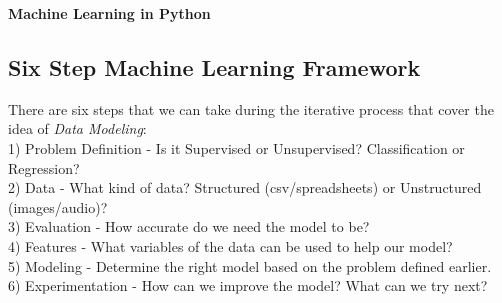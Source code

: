 \documentclass[11pt, a4paper]{article}
\begin{document}
	\begin{titlepage}
		\begin{center} \Huge \textbf{Machine Learning in Python} \end{center}
		\tableofcontents
		\newpage
	\end{titlepage}

	\begin{spacing}{1.1}
	\section{Six Step Machine Learning Framework}
	There are six steps that we can take during the iterative process that cover the idea of \textit{Data Modeling}: \vspace*{1mm}\\
	\hspace*{2mm} 1) Problem Definition - Is it Supervised or Unsupervised? Classification or Regression? \\
	\hspace*{2mm} 2) Data - What kind of data? Structured (csv/spreadsheets) or Unstructured (images/audio)?\\
	\hspace*{2mm} 3) Evaluation - How accurate do we need the model to be? \\
	\hspace*{2mm} 4) Features - What variables of the data can be used to help our model? \\
	\hspace*{2mm} 5) Modeling - Determine the right model based on the problem defined earlier. \\
	\hspace*{2mm} 6) Experimentation - How can we improve the model? What can we try next?

\end{spacing}
\end{document}
